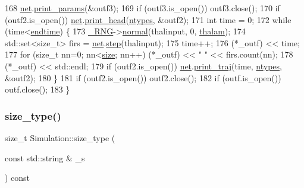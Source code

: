\begin{DoxyCode}
168     \hyperlink{classSimulation_a980a224fe68945549f217067ffc74f7c}{net}.\hyperlink{classNetwork_afc43116eb2429aeec0f3c6a54d252142}{print\_params}(&outf3);
169     \textcolor{keywordflow}{if} (outf3.is\_open()) outf3.close();
170     \textcolor{keywordflow}{if} (outf2.is\_open()) \hyperlink{classSimulation_a980a224fe68945549f217067ffc74f7c}{net}.\hyperlink{classNetwork_ab572dd33cb91d9f0aae89c4477809d26}{print\_head}(\hyperlink{classSimulation_a445d67187d6cc08c4c098ca498ee87d7}{ntypes}, &outf2);
171     \textcolor{keywordtype}{int} time = 0;
172     \textcolor{keywordflow}{while} (time<\hyperlink{classSimulation_ae57735a4ad942d9d217fb2235a644d1b}{endtime}) \{
173         \hyperlink{main_8cpp_ad20d7a8b3940b60cfd9cd7188fb503ea}{\_RNG}->\hyperlink{classRandomNumbers_a4ef5917200da65aa267735d389bdf995}{normal}(thalinput, 0, \hyperlink{classSimulation_a7fca2f5f79a662f91736b0e5f30598c1}{thalam});
174         std::set<size\_t> firs = \hyperlink{classSimulation_a980a224fe68945549f217067ffc74f7c}{net}.\hyperlink{classNetwork_a53665a3a69e6ec894c313d0ce3fb7f34}{step}(thalinput);
175         time++;
176         (*\_outf) << time;
177         \textcolor{keywordflow}{for} (\textcolor{keywordtype}{size\_t} nn=0; nn<\hyperlink{classSimulation_ae198f9ac020ed6bc6ebbd608ab3f959d}{size}; nn++) (*\_outf) << \textcolor{stringliteral}{" "} << firs.count(nn);
178         (*\_outf) << std::endl;
179         \textcolor{keywordflow}{if} (outf2.is\_open()) \hyperlink{classSimulation_a980a224fe68945549f217067ffc74f7c}{net}.\hyperlink{classNetwork_ae460d31557bba058fdf66e4fe5feb801}{print\_traj}(time, \hyperlink{classSimulation_a445d67187d6cc08c4c098ca498ee87d7}{ntypes}, &outf2);
180     \}
181     \textcolor{keywordflow}{if} (outf2.is\_open()) outf2.close();
182     \textcolor{keywordflow}{if} (outf.is\_open()) outf.close();        
183 \}
\end{DoxyCode}
\mbox{\label{classSimulation_a7d0ca858dfec187001ecbab2081f9d04}} 
\subsubsection{\texorpdfstring{size\+\_\+type()}{size\_type()}}
{\footnotesize\ttfamily size\+\_\+t Simulation\+::size\+\_\+type (\begin{DoxyParamCaption}\item[{const std\+::string \&}]{\+\_\+s }\end{DoxyParamCaption}) const}

